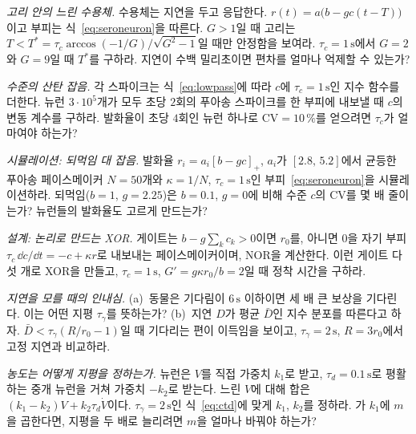\begin{exercise}[\lvlB]
\label{ex:05:3}
\emph{고리 안의 느린 수용체.}  수용체는 지연을 두고 응답한다. $r(t)=a\bigl(b-gc(t-T)\bigr)$이고 부피는 식~\eqref{eq:seroneuron}을 따른다. $G>1$일 때 고리는 $T<T^*=\tau_c\arccos(-1/G)/\sqrt{G^2-1}$일 때만 안정함을 보여라. $\tau_c=1\,\text{s}$에서 $G=2$와 $G=9$일 때 $T^*$를 구하라. 지연이 수백 밀리초이면 편차를 얼마나 억제할 수 있는가?
\end{exercise}

\begin{exercise}[\lvlB]
\label{ex:05:4}
\emph{수준의 산탄 잡음.} 각 스파이크는 식~\eqref{eq:lowpass}에 따라 $c$에 $\tau_c=1\,\text{s}$인 지수 함수를 더한다.  뉴런 $3\cdot10^5$개가 모두 초당 $2$회의 푸아송 스파이크를 한 부피에 내보낼 때 $c$의 변동 계수를 구하라. 발화율이 초당 $4$회인 뉴런 하나로 $\mathrm{CV}=10\,\%$를 얻으려면 $\tau_c$가 얼마여야 하는가?
\end{exercise}

\begin{exercise}[\lvlB]
\label{ex:05:5}
\emph{시뮬레이션: 되먹임 대 잡음.} 발화율 $r_i=a_i[b-gc]_+$, $a_i$가 $[2.8,\,5.2]$에서 균등한 푸아송 페이스메이커 $N=50$개와 $\kappa=1/N$, $\tau_c=1\,\text{s}$인 부피~\eqref{eq:seroneuron}을 시뮬레이션하라. 되먹임($b=1$, $g=2.25$)은 $b=0.1$, $g=0$에 비해 수준 $c$의 CV를 몇 배 줄이는가? 뉴런들의 발화율도 고르게 만드는가?
\end{exercise}

\begin{exercise}[\lvlB]
\label{ex:05:6}
\emph{설계:  논리로 만드는 XOR.} 게이트는 $b-g\sum_kc_k>0$이면 $r_0$를, 아니면 $0$을 자기 부피 $\tau_c\,\dd c/\dd t=-c+\kappa r$로 내보내는 페이스메이커이며, NOR을 계산한다. 이런 게이트 다섯 개로 XOR을 만들고, $\tau_c=1\,\text{s}$, $G'=g\kappa r_0/b=2$일 때 정착 시간을 구하라.
\end{exercise}

\begin{exercise}[\lvlB]
\label{ex:05:7}
\emph{지연을 모를 때의 인내심.} (a)~동물은 기다림이 $6\,\text{s}$ 이하이면 세 배 큰 보상을 기다린다. 이는 어떤 지평 $\tau_\gamma$를 뜻하는가? (b)~지연 $D$가 평균 $\bar D$인 지수 분포를 따른다고 하자. $\bar D<\tau_\gamma(R/r_0-1)$일 때 기다리는 편이 이득임을 보이고, $\tau_\gamma=2\,\text{s}$, $R=3r_0$에서 고정 지연과 비교하라.
\end{exercise}

\begin{exercise}[\lvlC]
\label{ex:05:8}
\emph{농도는 어떻게 지평을 정하는가.}  뉴런은 $V$를 직접 가중치 $k_1$로 받고, $\tau_d=0.1\,\text{s}$로 평활하는  중개 뉴런을 거쳐 가중치 $-k_2$로 받는다. 느린 $V$에 대해 합은 $(k_1-k_2)V+k_2\tau_d\dot V$이다. $\tau_\gamma=2\,\text{s}$인 식~\eqref{eq:ctd}에 맞게 $k_1$, $k_2$를 정하라. 가 $k_1$에 $m$을 곱한다면, 지평을 두 배로 늘리려면 $m$을 얼마나 바꿔야 하는가?
\end{exercise}
